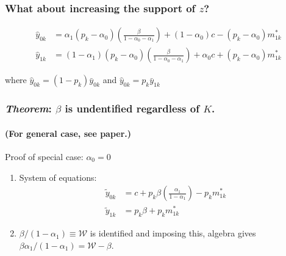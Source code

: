 \documentclass{beamer}
\begin{document}
\begin{frame}
  \frametitle{What about increasing the support of $z$?}
  \alert{}
\begin{align*}
  \hat{y}_{0k} &=\alpha_1(p_k - \alpha_0)\left(\frac{\beta}{1 - \alpha_0 - \alpha_1}\right) + (1-\alpha_0)c - (p _k -  \alpha_0)m_{1k}^* \\[1.5ex]
  \label{eq:MC1IV}
  \hat{y}_{1k} &=(1-\alpha_1)(p_k - \alpha_0)\left(\frac{\beta}{1 - \alpha_0 - \alpha_1}\right) + \alpha_0 c + (p _k -  \alpha_0)m_{1k}^*
\end{align*}

\vspace{0.5em}
where $\hat{y}_{0k}=(1-p_k)\bar{y}_{0k}$ and $\hat{y}_{0k}=p_k\bar{y}_{1k}$


\vspace{2em} 

\hfill \alert{}
\end{frame}
\begin{frame}
  \frametitle{\emph{Theorem}: $\beta$ is undentified regardless of $K$.}
  \framesubtitle{(For general case, see paper.)}
  \begin{block}{Proof of special case: $\alpha_0 = 0$ }
    \begin{enumerate}
      \item System of equations: 
    \vspace{0.5em}
\begin{align*}
  \widetilde{y}_{0k} &=c + p_k \beta \left(\frac{\alpha_1}{1 -  \alpha_1}\right) - p _k m_{1k}^* \\
  \widetilde{y}_{1k} &=p_k \beta + p _k m_{1k}^*
\end{align*}
  \item $\beta/(1-\alpha_1) \equiv \mathcal{W}$ is identified and imposing this, algebra gives $\beta\alpha_1/(1-\alpha_1) = \mathcal{W} - \beta$. 

    \end{enumerate}
  \end{block} 
    
\end{frame}
\end{document}
